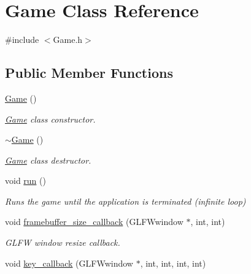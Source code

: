 \hypertarget{class_game}{}\section{Game Class Reference}
\label{class_game}


{\ttfamily \#include $<$Game.\+h$>$}

\subsection*{Public Member Functions}
\begin{DoxyCompactItemize}
\item 
\hyperlink{class_game_ad59df6562a58a614fda24622d3715b65}{Game} ()\hypertarget{class_game_ad59df6562a58a614fda24622d3715b65}{}\label{class_game_ad59df6562a58a614fda24622d3715b65}

\begin{DoxyCompactList}\small\item\em \hyperlink{class_game}{Game} class constructor. \end{DoxyCompactList}\item 
\hyperlink{class_game_ae3d112ca6e0e55150d2fdbc704474530}{$\sim$\+Game} ()\hypertarget{class_game_ae3d112ca6e0e55150d2fdbc704474530}{}\label{class_game_ae3d112ca6e0e55150d2fdbc704474530}

\begin{DoxyCompactList}\small\item\em \hyperlink{class_game}{Game} class destructor. \end{DoxyCompactList}\item 
void \hyperlink{class_game_a1ab78f5ed0d5ea879157357cf2fb2afa}{run} ()\hypertarget{class_game_a1ab78f5ed0d5ea879157357cf2fb2afa}{}\label{class_game_a1ab78f5ed0d5ea879157357cf2fb2afa}

\begin{DoxyCompactList}\small\item\em Runs the game until the application is terminated (infinite loop) \end{DoxyCompactList}\item 
void \hyperlink{class_game_ace7bc47ba743c60418930ef28e670a7f}{framebuffer\+\_\+size\+\_\+callback} (G\+L\+F\+Wwindow $\ast$, int, int)\hypertarget{class_game_ace7bc47ba743c60418930ef28e670a7f}{}\label{class_game_ace7bc47ba743c60418930ef28e670a7f}

\begin{DoxyCompactList}\small\item\em G\+L\+FW window resize callback. \end{DoxyCompactList}\item 
void \hyperlink{class_game_a69df77af132026325999ae3700825e29}{key\+\_\+callback} (G\+L\+F\+Wwindow $\ast$, int, int, int, int)\hypertarget{class_game_a69df77af132026325999ae3700825e29}{}\label{class_game_a69df77af132026325999ae3700825e29}


\end{DoxyCompactItemize}
